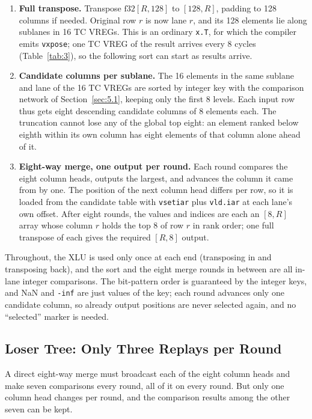 \documentclass[sigconf,nonacm,balance=false]{acmart}
\newcommand{\code}[1]{\texttt{#1}}
\begin{document}
\begin{enumerate}
\item \textbf{Full transpose.} Transpose $\mathrm{f32}[R,128]$ to $[128,R]$, padding to 128 columns if needed. Original row $r$ is now lane $r$, and its 128 elements lie along sublanes in 16 TC VREGs. This is an ordinary \code{x.\allowbreak{}T}, for which the compiler emits \code{vxpose}; one TC VREG of the result arrives every 8 cycles (Table~\ref{tab:3}), so the following sort can start as results arrive.
\item \textbf{Candidate columns per sublane.} The 16 elements in the same sublane and lane of the 16 TC VREGs are sorted by integer key with the comparison network of Section~\ref{sec:5.1}, keeping only the first 8 levels. Each input row thus gets eight descending candidate columns of 8 elements each. The truncation cannot lose any of the global top eight: an element ranked below eighth within its own column has eight elements of that column alone ahead of it.
\item \textbf{Eight-way merge, one output per round.} Each round compares the eight column heads, outputs the largest, and advances the column it came from by one. The position of the next column head differs per row, so it is loaded from the candidate table with \code{vsetiar} plus \code{vld.\allowbreak{}iar} at each lane's own offset. After eight rounds, the values and indices are each an $[8,R]$ array whose column $r$ holds the top 8 of row $r$ in rank order; one full transpose of each gives the required $[R,8]$ output.
\end{enumerate}

Throughout, the XLU is used only once at each end (transposing in and transposing back), and the sort and the eight merge rounds in between are all in-lane integer comparisons. The bit-pattern order is guaranteed by the integer keys, and NaN and \code{-inf} are just values of the key; each round advances only one candidate column, so already output positions are never selected again, and no ``selected'' marker is needed.

\subsection{Loser Tree: Only Three Replays per Round}
\label{sec:6.4}

A direct eight-way merge must broadcast each of the eight column heads and make seven comparisons every round, all of it on every round. But only one column head changes per round, and the comparison results among the other seven can be kept.
\end{document}
